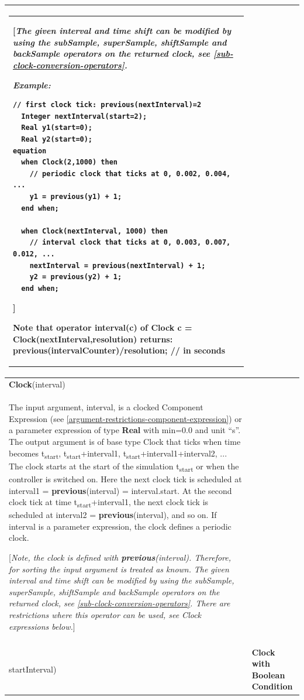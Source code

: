 \documentclass[10pt,a4paper]{report}
\renewcommand{\newline}{\hspace*{\fill}\raggedright\linebreak}
\renewcommand{\newline}{\hspace*{\fill}\linebreak}
\begin{document}
\begin{longtable}[]{|p{3cm}|p{11cm}|}
\begin{tabular}{@{}p{11cm}@{}}
{[}\emph{The given interval and time shift can be modified by using the
subSample, superSample, shiftSample and backSample operators on the
returned clock, see \ref{sub-clock-conversion-operators}.}

\emph{Example:}
\begin{lstlisting}[language=modelica]
  // first clock tick: previous(nextInterval)=2    
  Integer nextInterval(start=2);    
  Real y1(start=0);    
  Real y2(start=0); 
equation   
  when Clock(2,1000) then      
    // periodic clock that ticks at 0, 0.002, 0.004, ...      
    y1 = previous(y1) + 1;   
  end when; 
 
  when Clock(nextInterval, 1000) then      
    // interval clock that ticks at 0, 0.003, 0.007, 0.012, ...     
    nextInterval = previous(nextInterval) + 1;     
    y2 = previous(y2) + 1;   
  end when; 
\end{lstlisting}
{]}

Note that operator interval(c) of Clock c =
Clock(nextInterval,resolution) returns:\newline
previous(intervalCounter)/resolution; // in seconds
\end{tabular}\\ \hline
\textbf{Clock}(interval)
&
\begin{tabular}{@{}p{11cm}@{}}
\textbf{Clock with Real Interval}\\

The input argument, interval, is a clocked Component Expression (see
\ref{argument-restrictions-component-expression}) or a parameter expression of type \textbf{Real} with
min=0.0 and unit ``s''. The output argument is of base type Clock that
ticks when time becomes t\textsubscript{start},
t\textsubscript{start}+interval1,
t\textsubscript{start}+interval1+interval2, ... The clock starts at the
start of the simulation t\textsubscript{start} or when the controller is
switched on. Here the next clock tick is scheduled at interval1 =
\textbf{previous}(interval) = interval.start. At the second clock tick
at time t\textsubscript{start}+interval1, the next clock tick is
scheduled at interval2 = \textbf{previous}(interval), and so on. If
interval is a parameter expression, the clock defines a periodic clock.

{[}\emph{Note, the clock is defined with \textbf{previous}(interval).
Therefore, for sorting the input argument is treated as known.}
\emph{The given interval and time shift can be modified by using the
subSample, superSample, shiftSample and backSample operators on the
returned clock, see \ref{sub-clock-conversion-operators}. There are restrictions where
this operator can be used, see Clock expressions below.}{]}
\end{tabular}\\ \hline
\begin{tabular}{@{}p{3cm}@{}}
\textbf{Clock}(condition,\\
startInterval)
\end{tabular}
&
\textbf{Clock with Boolean Condition}


\end{longtable}
\end{document}
